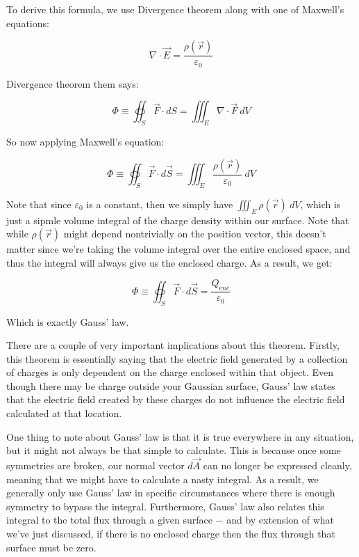 \documentclass{report}
\theoremstyle{definition}
\numberwithin{equation}{section}
\numberwithin{definition}{section}
\begin{document}
    \begin{remark}
        To derive this formula, we use Divergence theorem along with one of Maxwell's equations:

        \[ \nabla \cdot \vec{E} = \frac{\rho(\vec r)}{\varepsilon_0}\]

        Divergence theorem them says:

        \[ \Phi \equiv \oiint_S \vec{F} \cdot dS = \iiint_E \nabla \cdot \vec{F} \ dV\]

        So now applying Maxwell's equation:

        \[ \Phi \equiv \oiint_S \vec{F} \cdot d\vec{S} = \iiint_E \frac{\rho(\vec{r})}{\varepsilon_0} \ dV\]

        Note that since $\varepsilon_0$ is a constant, then we simply have $\iiint_E \rho(\vec{r}) \ dV$, which is just a sipmle volume integral of the charge density within our surface. Note that while $\rho(\vec{r})$ might depend nontrivially on the position vector, this doesn't matter since we're taking the volume integral over the entire enclosed space, and thus the integral will always give us the enclosed charge. As a result, we get:


        \[ \Phi \equiv \oiint_S \vec{F} \cdot d\vec{S} = \frac{Q_{enc}}{\varepsilon_0}\] 

        Which is exactly Gauss' law.
        
    \end{remark}
    There are a couple of very important implications about this theorem. Firstly, this theorem is essentially saying that the electric field generated by a collection of charges is only dependent on the charge enclosed within that object. Even though there may be charge outside your Gaussian surface, Gauss' law states that the electric field created by these charges do not influence the electric field calculated at that location. 
    
    One thing to note about Gauss' law is that it is true everywhere in any situation, but it might not always be that simple to calculate. This is because once some symmetries are broken, our normal vector $d\vec{A}$ can no longer be expressed cleanly, meaning that we might have to calculate a nasty integral. As a result, we generally only use Gauss' law in specific circumstances where there is enough symmetry to bypass the integral. Furthermore, Gauss' law also relates this integral to the total flux through a given surface $-$ and by extension of what we've just discussed, if there is no enclosed charge then the flux through that surface must be zero. 
\end{document}
